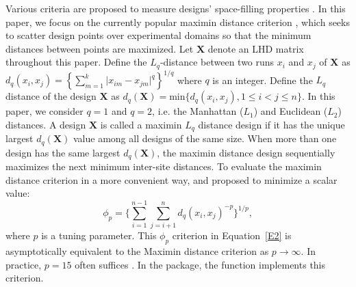 Various criteria are proposed to measure designs' space-filling properties \citep{johnson1990minimax, hickernell1998generalized, fang2002centered}. In this paper, we focus on the currently popular maximin distance criterion \citep{johnson1990minimax}, which seeks to scatter design points over experimental domains so that the minimum distances between points are maximized. Let $\textbf{X}$ denote an LHD matrix throughout this paper. Define the $L_q$-distance between two runs $x_i$ and $x_j$ of $\textbf{X}$ as $d_q(x_i, x_j) =  \left\{ \sum_{m=1}^{k} \vert x_{im}-x_{jm}\vert ^q \right\}^{1/q}$ where $q$ is an integer. Define the $L_q$ distance of the design $\textbf{X}$ as $d_q(\textbf{X}) = \text{min} \{d_q(x_i, x_j),  1 \leq i<j \leq n \}$. In this paper, we consider $q=1$ and $q=2$, i.e. the Manhattan ($L_1$) and Euclidean ($L_2$) distances. A design $\textbf{X}$ is called a maximin $L_q$ distance design if it has the unique largest $d_q(\textbf{X})$ value among all designs of the same size. When more than one design has the same largest $d_q(\textbf{X})$, the maximin distance design sequentially maximizes the next minimum inter-site distances.
To evaluate the maximin distance criterion in a more convenient way,  \cite{morris1995exploratory} and \cite{jin2005efficient} proposed to minimize a scalar value:
\begin{equation}\label{E2}
	\phi_{p}= \bigg\{\sum_{i=1}^{n-1}\sum_{j=i+1}^{n}d_q(x_i, x_j)^{-p} \bigg\} ^{1/p},
\end{equation}
where $p$ is a tuning parameter.
This $\phi_{p}$ criterion in Equation~\eqref{E2} is asymptotically equivalent to the Maximin distance criterion as $p \to \infty$. In practice, $p=15$ often suffices \citep{morris1995exploratory}. In the  package, the function  implements this criterion.

